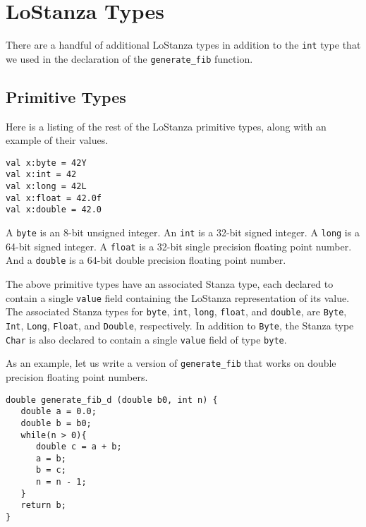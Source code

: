 \documentclass[10pt,oneside]{book}
\begin{document}
\section{LoStanza Types}
There are a handful of additional LoStanza types in addition to the \texttt{\frenchspacing int} type that we used in the declaration of the \texttt{\frenchspacing generate\_fib} function. 

\subsection*{Primitive Types}
Here is a listing of the rest of the LoStanza primitive types, along with an example of their values.
\begin{lstlisting}
val x:byte = 42Y
val x:int = 42
val x:long = 42L
val x:float = 42.0f
val x:double = 42.0
\end{lstlisting}

A \texttt{\frenchspacing byte} is an 8-bit unsigned integer. An \texttt{\frenchspacing int} is a 32-bit signed integer. A \texttt{\frenchspacing long} is a 64-bit signed integer. A \texttt{\frenchspacing float} is a 32-bit single precision floating point number. And a \texttt{\frenchspacing double} is a 64-bit double precision floating point number.

The above primitive types have an associated Stanza type, each declared to contain a single \texttt{\frenchspacing value} field containing the LoStanza representation of its value. The associated Stanza types for \texttt{\frenchspacing byte}, \texttt{\frenchspacing int}, \texttt{\frenchspacing long}, \texttt{\frenchspacing float}, and \texttt{\frenchspacing double}, are \texttt{\frenchspacing Byte}, \texttt{\frenchspacing Int}, \texttt{\frenchspacing Long}, \texttt{\frenchspacing Float}, and \texttt{\frenchspacing Double}, respectively. In addition to \texttt{\frenchspacing Byte}, the Stanza type \texttt{\frenchspacing Char} is also declared to contain a single \texttt{\frenchspacing value} field of type \texttt{\frenchspacing byte}.

As an example, let us write a version of \texttt{\frenchspacing generate\_fib} that works on double precision floating point numbers.
\begin{lstlisting}
double generate_fib_d (double b0, int n) {
   double a = 0.0;
   double b = b0;
   while(n > 0){
      double c = a + b;
      a = b;
      b = c;
      n = n - 1;
   }
   return b;
}
\end{lstlisting}
\end{document}
